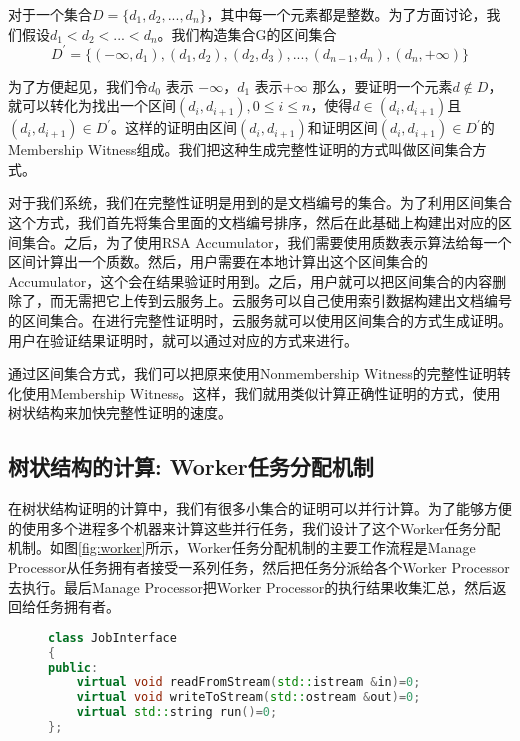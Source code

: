 对于一个集合$D = \{d_1, d_2, ..., d_n\}$，其中每一个元素都是整数。为了方面讨论，我们假设$d_1 < d_2 < ... < d_n$。我们构造集合G的区间集合
\begin{equation} D^\prime = \{(-\infty, d_1), (d_1, d_2), (d_2, d_3), ... ,(d_{n-1}, d_n), (d_n, +\infty)\}\end{equation}

为了方便起见，我们令$d_0$ 表示 $-\infty$，$d_1$ 表示$+\infty$
那么，要证明一个元素$d \notin D$，就可以转化为找出一个区间$(d_i, d_{i+1}), 0 \le i \le n$，使得$d \in (d_i, d_{i+1})$且$(d_i, d_{i+1}) \in D^\prime$。这样的证明由区间$(d_i, d_{i+1})$和证明区间$(d_i, d_{i+1}) \in D^\prime$的Membership Witness组成。我们把这种生成完整性证明的方式叫做区间集合方式。

对于我们系统，我们在完整性证明是用到的是文档编号的集合。为了利用区间集合这个方式，我们首先将集合里面的文档编号排序，然后在此基础上构建出对应的区间集合。之后，为了使用RSA Accumulator，我们需要使用质数表示算法给每一个区间计算出一个质数。然后，用户需要在本地计算出这个区间集合的Accumulator，这个会在结果验证时用到。之后，用户就可以把区间集合的内容删除了，而无需把它上传到云服务上。云服务可以自己使用索引数据构建出文档编号的区间集合。在进行完整性证明时，云服务就可以使用区间集合的方式生成证明。用户在验证结果证明时，就可以通过对应的方式来进行。

通过区间集合方式，我们可以把原来使用Nonmembership Witness的完整性证明转化使用Membership Witness。这样，我们就用类似计算正确性证明的方式，使用树状结构来加快完整性证明的速度。


\subsection{树状结构的计算: Worker任务分配机制}
在树状结构证明的计算中，我们有很多小集合的证明可以并行计算。为了能够方便的使用多个进程多个机器来计算这些并行任务，我们设计了这个Worker任务分配机制。如图\ref{fig:worker}所示，Worker任务分配机制的主要工作流程是Manage Processor从任务拥有者接受一系列任务，然后把任务分派给各个Worker Processor去执行。最后Manage Processor把Worker Processor的执行结果收集汇总，然后返回给任务拥有者。

\begin{figure}[htb]
\begin{lstlisting}[language=C++] 
class JobInterface
{
public:
    virtual void readFromStream(std::istream &in)=0;
    virtual void writeToStream(std::ostream &out)=0;
    virtual std::string run()=0;
};
\end{lstlisting}
\end{figure}


